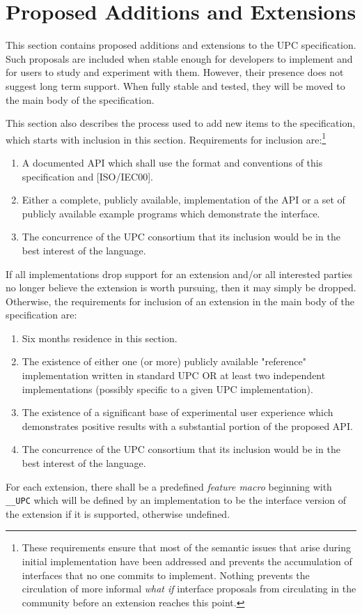 \pagebreak
\section{Proposed Additions and Extensions}

\np This section contains proposed additions and extensions to the UPC
    specification.  Such proposals are included when stable enough for
    developers to implement and for users to study and experiment with
    them.  However, their presence does not suggest long term support.
    When fully stable and tested, they will be moved to the main body of
    the specification.

\np This section also describes the process used to add new items to the
    specification, which starts with inclusion in this section.  Requirements
    for inclusion are:\footnote{These requirements ensure that most of
    the semantic issues that arise during initial implementation have
    been addressed and prevents the accumulation of interfaces that no
    one commits to implement. Nothing prevents the circulation of more
    informal {\em what if} interface proposals from circulating in the
    community before an extension reaches this point.}

\begin{enumerate}
\item A documented API which shall use the format and conventions of
    this specification and [ISO/IEC00].

\item Either a complete, publicly available, implementation of the API
    or a set of publicly available example programs which demonstrate
    the interface.
    
\item The concurrence of the UPC consortium that its inclusion would be
    in the best interest of the language.    
\end{enumerate}

\np If all implementations drop support for an extension and/or all interested parties
    no longer believe the extension is worth pursuing, then it may simply be dropped.
    Otherwise, the requirements for inclusion of an extension in the main body of the
    specification are:

\begin{enumerate}
\item Six months residence in this section.

\item The existence of either one (or more) publicly available "reference" implementation 
written in standard UPC OR at least two independent implementations (possibly specific 
to a given UPC implementation).

\item The existence of a significant base of experimental user experience
   which demonstrates positive results with a substantial portion of the
   proposed API.

\item The concurrence of the UPC consortium that its inclusion would be
    in the best interest of the language.
\end{enumerate}

\np For each extension, there shall be a predefined {\em feature macro}
   beginning with {\tt \_\_UPC} which will be defined by an implementation
   to be the interface version of the extension if it is supported, otherwise
   undefined.

